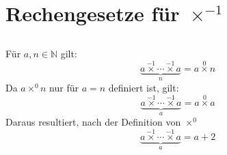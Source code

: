 \documentclass{article}
\begin{document}
\section{Rechengesetze f\"ur $\operatorname*{\times}^{-1}$\newline}

\subsection{}
F\"ur $a, n \in \mathbb{N}$ gilt:
\[ \underbrace{a \operatorname*{\times}^{-1} \dotsb \operatorname*{\times}^{-1} a}_n = a\operatorname*{\times}^0 n \]
Da $a\operatorname*{\times}^0 n$ nur f\"ur $a=n$ definiert ist, gilt:
\[ \underbrace{a \operatorname*{\times}^{-1} \dotsb \operatorname*{\times}^{-1} a}_a = a\operatorname*{\times}^0 a \]
Daraus resultiert, nach der Definition von $\operatorname*{\times}^0$
\[ \underbrace{a \operatorname*{\times}^{-1} \dotsb \operatorname*{\times}^{-1} a}_a = a + 2 \]
\end{document}
